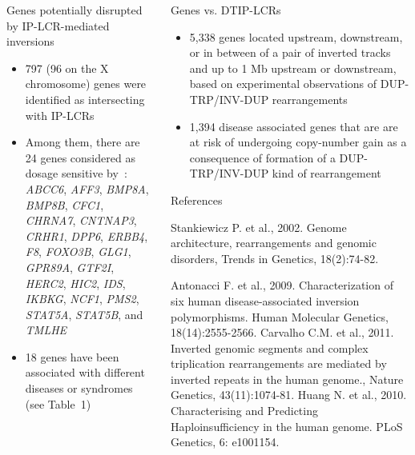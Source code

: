 \documentclass[final]{beamer}
\newlength{\onecolwid}
\newlength{\twocolwid}
\begin{document}
\begin{frame}[t]
\begin{columns}[t]
\begin{column}{\twocolwid}
\begin{columns}[t,totalwidth=\twocolwid]
\begin{column}{\onecolwid}
\begin{block}{Genes potentially disrupted by IP-LCR-mediated inversions}  
	\begin{itemize} 
	\item 797 (96 on the X chromosome) genes were identified as intersecting with IP-LCRs
	\item Among them, there are 24 genes considered as dosage sensitive by~\cite{huang}: 
\textit{ABCC6}, \textit{AFF3}, \textit{BMP8A}, \textit{BMP8B}, \textit{CFC1}, \textit{CHRNA7}, 
\textit{CNTNAP3}, \textit{CRHR1}, \textit{DPP6}, \textit{ERBB4}, \textit{F8}, 
\textit{FOXO3B}, \textit{GLG1}, \textit{GPR89A}, \textit{GTF2I}, \textit{HERC2}, \textit{HIC2}, \textit{IDS}, 
\textit{IKBKG}, \textit{NCF1}, \textit{PMS2}, \textit{STAT5A}, \textit{STAT5B}, and \textit{TMLHE}
	\item 18 genes have been associated with different diseases or syndromes (see Table~1)
	\end{itemize}
	\end{block}

        \end{column}
        \begin{column}{\onecolwid}


	\begin{block}{Genes vs. DTIP-LCRs}  
	\begin{itemize} 
	\item 5,338 genes located upstream, downstream, or in between of a pair of inverted tracks and up to 1 Mb upstream or downstream, based on experimental observations of DUP-TRP/INV-DUP rearrangements 
        \item 1,394 disease associated genes that are are at risk of undergoing copy-number gain as a consequence of formation of a DUP-TRP/INV-DUP kind of rearrangement 
	\end{itemize}
	\end{block}


          \begin{block}{References}
            
		        \tiny{\begin{thebibliography}{99}
 Stankiewicz P. et al., 2002. Genome architecture, rearrangements and genomic disorders, 
Trends in Genetics, 18(2):74-82.

 Antonacci F. et al., 2009.
Characterization of six human disease-associated inversion polymorphisms. Human Molecular Genetics, 18(14):2555-2566. 
 Carvalho C.M. et al., 2011. 
Inverted genomic segments and complex triplication rearrangements are mediated by inverted repeats in the human genome., 
Nature Genetics, 43(11):1074-81.
 Huang N. et al., 2010. Characterising and Predicting Haploinsufficiency in the human genome. PLoS Genetics, 6: e1001154. 


\end{thebibliography}}
\end{block}
\end{column}
\end{columns}
\end{column}
\end{columns}
\end{frame}
\end{document}
